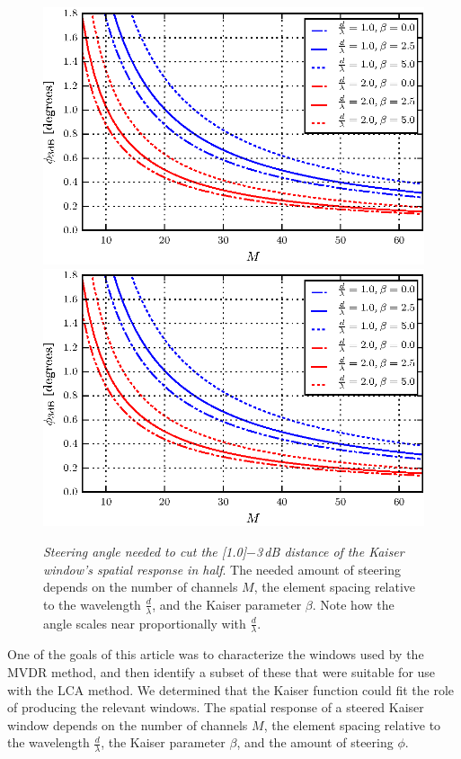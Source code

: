 \documentclass[10pt,journal,draftclsnofoot,onecolumn]{IEEEtran}
\let\MYoriglatexcaption\caption               %
\renewcommand{\caption}[2][\relax]{\MYoriglatexcaption[#2]{#2}}
\newcommand\1{\vec 1}
\newcommand\minus{\scalebox{0.75}[1.0]{$-$}}
\begin{document}
\begin{figure}[t]
\ifPeerReview\centering%
\includegraphics[width=.5\linewidth]{gfx/buske8_online.eps}%
\else%
\includegraphics[width=\linewidth]{gfx/buske8_online.eps}%
\fi%
\caption{\emph{Steering angle needed to cut the \protect\minus{}3\,dB distance of the Kaiser window's spatial response in half}. The needed amount of steering depends on the number of channels $M$, the element spacing relative to the wavelength $\frac{d}{\lambda}$, and the Kaiser parameter $\beta$. Note how the angle scales near proportionally with $\frac{d}{\lambda}$. }\label{steering_angle_3dB}
\end{figure}
%
One of the goals of this article was to characterize the windows used by the MVDR method, and then identify a subset of these that were suitable for use with the LCA method. We determined that the Kaiser function could fit the role of producing the relevant windows. The spatial response of a steered Kaiser window depends on the number of channels $M$, the element spacing relative to the wavelength $\frac{d}{\lambda}$, the Kaiser parameter $\beta$, and the amount of steering $\phi$.
\end{document}
